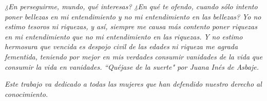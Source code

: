   
\newpage


\begin{flushleft}

\textit{¿En perseguirme, mundo, qué interesas?}\newline
\textit{¿En qué te ofendo, cuando sólo intento}\newline
\textit{poner bellezas en mi entendimiento}\newline
\textit{y no mi entendimiento en las bellezas?}\newline
\textit{Yo no estimo tesoros ni riquezas,}\newline
\textit{y así, siempre me causa más contento}\newline
\textit{poner riquezas en mi entendimiento}\newline
\textit{que no mi entendimiento en las riquezas.}\newline
\textit{Y no estimo hermosura que vencida}\newline
\textit{es despojo civil de las edades}\newline
\textit{ni riqueza me agrada fementida,}\newline
\textit{teniendo por mejor en mis verdades}\newline
\textit{consumir vanidades de la vida}\newline
\textit{que consumir la vida en vanidades.}\newline
\textit{``Quéjase de la suerte" por Juana Inés de Asbaje.}\newline

\textit{Este trabajo va dedicado a todas las mujeres que han defendido nuestro derecho al conocimiento.}
\end{flushleft}



\clearpage